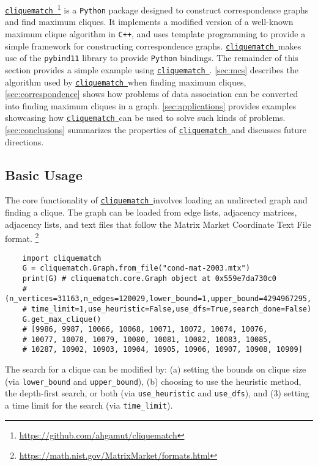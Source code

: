 \documentclass[12pt]{article}
\newcommand{\cred}{\color{red}} %
\newcommand{\clqm}{\href{https://github.com/ahgamut/cliquematch}{\texttt{cliquematch}~}}
\begin{document}
\clqm \footnote{\url{https://github.com/ahgamut/cliquematch}} is a \texttt{Python} package designed to construct
correspondence graphs and find maximum cliques. It implements a modified version of a
well-known maximum clique algorithm \citep{pattabiraman2015} in \texttt{C++}, and
uses template programming to provide a simple framework for constructing correspondence
graphs. \clqm makes use of the \texttt{pybind11} library to provide
\texttt{Python} bindings. The remainder of this section provides a simple example
using \clqm. \autoref{sec:mcs} describes the algorithm used by \clqm when finding
maximum cliques, \autoref{sec:correspondence} shows how problems of data association can be
converted into finding maximum cliques in a graph. \autoref{sec:applications} provides
examples showcasing how \clqm can be used to solve such kinds of problems.
\autoref{sec:conclusions} summarizes the properties of \clqm and discusses future
directions.


\subsection{Basic Usage}%
\label{sub:basic}

The core functionality of \clqm involves loading an undirected graph and finding a
clique. The graph can be loaded from edge lists, adjacency matrices, adjacency lists, and
text files that follow the Matrix Market Coordinate Text File format.
\footnote{\url{https://math.nist.gov/MatrixMarket/formats.html}}

\begin{verbatim}
	import cliquematch 
	G = cliquematch.Graph.from_file("cond-mat-2003.mtx")
	print(G) # cliquematch.core.Graph object at 0x559e7da730c0
	# (n_vertices=31163,n_edges=120029,lower_bound=1,upper_bound=4294967295,
	# time_limit=1,use_heuristic=False,use_dfs=True,search_done=False) 
	G.get_max_clique() 
	# [9986, 9987, 10066, 10068, 10071, 10072, 10074, 10076, 
	# 10077, 10078, 10079, 10080, 10081, 10082, 10083, 10085, 
	# 10287, 10902, 10903, 10904, 10905, 10906, 10907, 10908, 10909]
\end{verbatim}

The search for a clique can be modified by: (a) setting the bounds on clique size (via
\texttt{lower\_bound} and \texttt{upper\_bound}), (b) choosing to use the heuristic
method, the depth-first search, or both (via \texttt{use\_heuristic} and
\texttt{use\_dfs}), and (3) setting a time limit for the search (via
\texttt{time\_limit}).
\end{document}
